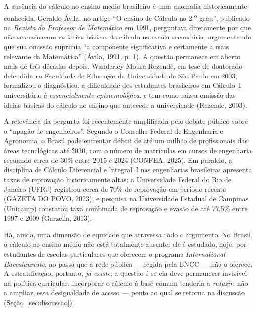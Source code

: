 \documentclass[12pt,a4paper,oneside]{article}
\begin{document}
A ausência do cálculo no ensino médio brasileiro é uma anomalia
historicamente conhecida. Geraldo Ávila, no artigo ``O ensino de Cálculo
no 2.\textsuperscript{o} grau'', publicado na \emph{Revista do Professor
de Matemática} em 1991, perguntava diretamente por que não se ensinavam
as ideias básicas do cálculo na escola secundária, argumentando que sua
omissão suprimia ``a componente significativa e certamente a mais
relevante da Matemática'' (Ávila, 1991, p. 1). A questão permanece em
aberto mais de três décadas depois. Wanderley Moura Rezende, em tese de
doutorado defendida na Faculdade de Educação da Universidade de São Paulo
em 2003, formalizou o diagnóstico: a dificuldade dos estudantes
brasileiros em Cálculo~I universitário é \emph{essencialmente
epistemológica}, e tem como raiz a omissão das ideias básicas do cálculo
no ensino que antecede a universidade (Rezende, 2003).

A relevância da pergunta foi recentemente amplificada pelo debate público
sobre o ``apagão de engenheiros''. Segundo o Conselho Federal de
Engenharia e Agronomia, o Brasil pode enfrentar déficit de até um milhão
de profissionais das áreas tecnológicas até 2030, com o número de
matrículas em cursos de engenharia recuando cerca de 30\% entre 2015 e
2024 (CONFEA, 2025). Em paralelo, a disciplina de Cálculo Diferencial e
Integral~I nas engenharias brasileiras apresenta taxas de reprovação
historicamente altas: a Universidade Federal do Rio de Janeiro (UFRJ)
registrou cerca de 70\% de reprovação em período recente (GAZETA DO POVO,
2023), e pesquisa na Universidade Estadual de Campinas (Unicamp)
constatou taxa combinada de reprovação e evasão de até 77,5\% entre 1997
e 2009 (Garzella, 2013).

Há, ainda, uma dimensão de equidade que atravessa todo o argumento. No
Brasil, o cálculo no ensino médio não está totalmente ausente: ele é
estudado, hoje, por estudantes de escolas particulares que oferecem o
programa \emph{International Baccalaureate}, ao passo que a rede pública
--- regida pela BNCC --- não o oferece. A estratificação, portanto,
\emph{já existe}; a questão é se ela deve permanecer invisível na política
curricular. Incorporar o cálculo à base comum tenderia a \emph{reduzir},
não a ampliar, essa desigualdade de acesso --- ponto ao qual se retorna na
discussão (Seção~\ref{sec:discussao}).
\end{document}
